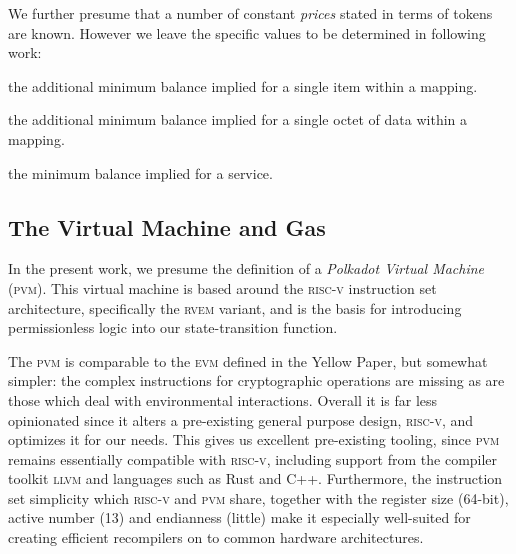 We further presume that a number of constant \emph{prices} stated in terms of tokens are known. However we leave the specific values to be determined in following work:

\begin{description}\label{eq:prices}
  \item[$\mathsf{B}_I$] the additional minimum balance implied for a single item within a mapping.
  \item[$\mathsf{B}_L$] the additional minimum balance implied for a single octet of data within a mapping.
  \item[$\mathsf{B}_S$] the minimum balance implied for a service.
\end{description}




















\subsection{The Virtual Machine and Gas}\label{sec:virtualmachineandgas}

In the present work, we presume the definition of a \emph{Polkadot Virtual Machine} (\textsc{pvm}). This virtual machine is based around the \textsc{risc-v} instruction set architecture, specifically the \textsc{rv}\textsc{em} variant, and is the basis for introducing permissionless logic into our state-transition function.

The \textsc{pvm} is comparable to the \textsc{evm} defined in the Yellow Paper, but somewhat simpler: the complex instructions for cryptographic operations are missing as are those which deal with environmental interactions. Overall it is far less opinionated since it alters a pre-existing general purpose design, \textsc{risc-v}, and optimizes it for our needs. This gives us excellent pre-existing tooling, since \textsc{pvm} remains essentially compatible with \textsc{risc-v}, including support from the compiler toolkit \textsc{llvm} and languages such as Rust and C++. Furthermore, the instruction set simplicity which \textsc{risc-v} and \textsc{pvm} share, together with the register size (64-bit), active number (13) and endianness (little) make it especially well-suited for creating efficient recompilers on to common hardware architectures.

